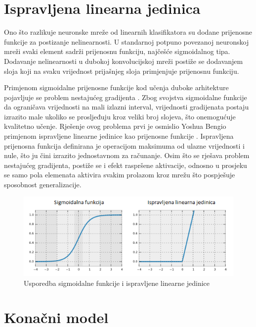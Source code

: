 \documentclass[lmodern, utf8, diplomski, numeric]{fer}
\begin{document}
\section{Ispravljena linearna jedinica}

Ono što razlikuje neuronske mreže od linearnih klasifikatora su dodane prijenosne funkcije za postizanje nelinearnosti. U standarnoj potpuno povezanoj neuronskoj mreži svaki element sadrži prijenosnu funkciju, najčešće sigmoidalnog tipa. Dodavanje nelinearnosti u dubokoj konvolucijskoj mreži postiže se dodavanjem sloja koji na svaku vrijednost prijašnjeg sloja primjenjuje prijenosnu funkciju. 

Primjenom sigmoidalne prijenosne funkcije kod učenja duboke arhitekture pojavljuje se problem nestajućeg gradijenta  \cite{hochreiter2001vanish}. Zbog svojstva sigmoidalne funkcije da ograničava vrijednosti na mali izlazni interval, vrijednosti gradijenata postaju izrazito male ukoliko se prosljeđuju kroz veliki broj slojeva, što onemogućuje kvalitetno učenje.
Rješenje ovog problema prvi je osmislio Yoshua Bengio primjenom ispravljene linearne jedinice  kao prijenosne funkcije \cite{bengio2011relu}. Ispravljena prijenosna funkcija definirana je operacijom maksimuma od ulazne vrijednosti i nule, što ju čini izrazito jednostavnom za računanje. Osim što se rješava problem nestajućeg gradijenta, postiže se i efekt raspršene aktivacije, odnosno u prosjeku se samo pola elemenata aktivira svakim prolazom kroz mrežu što pospješuje sposobnost generalizacije.  

\begin{figure}[ht!]
\centering
\includegraphics[width=15cm]{slike/sigmoid_relu.png}
\caption{Usporedba sigmoidalne funkcije i ispravljene linearne jedinice}
\end{figure}

\newpage

\section{Konačni model}
\end{document}
